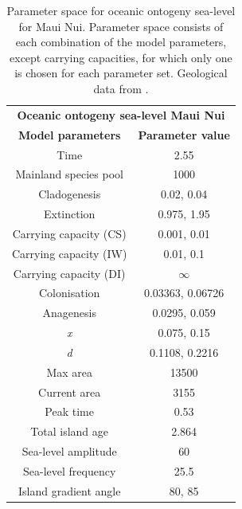 \begin{table}[ht]
    \centering
    \caption{Parameter space for oceanic ontogeny sea-level for Maui Nui. Parameter space consists of each combination of the model parameters, except carrying capacities, for which only one is chosen for each parameter set. Geological data from \cite{lim_true_2017}.}
    \begin{tabular}{ c | c }
        \multicolumn{2}{c}{\textbf{Oceanic ontogeny sea-level Maui Nui}} \\
        \textbf{Model parameters} & \textbf{Parameter value} \\ 
        \hline
        \hline
        Time & 2.55 \\
        \hline
        Mainland species pool & 1000 \\
        \hline
        Cladogenesis & 0.02, 0.04 \\
        \hline
        Extinction & 0.975, 1.95 \\
        \hline
        Carrying capacity (CS) & 0.001, 0.01 \\
        \hline
        Carrying capacity (IW) & 0.01, 0.1 \\
        \hline
        Carrying capacity (DI) & $\infty$ \\
        \hline
        Colonisation & 0.03363, 0.06726 \\
        \hline
        Anagenesis & 0.0295, 0.059 \\
        \hline
        \textit{x} & 0.075, 0.15 \\
        \hline
        \textit{d} & 0.1108, 0.2216 \\
        \hline
        Max area & 13500 \\
        \hline
        Current area & 3155 \\
        \hline
        Peak time & 0.53 \\
        \hline
        Total island age & 2.864 \\
        \hline
        Sea-level amplitude & 60 \\
        \hline
        Sea-level frequency & 25.5 \\
        \hline
        Island gradient angle & 80, 85 \\
    \end{tabular}
    \label{tab:oceanic_ontogeny_sea_level_young}
\end{table}

